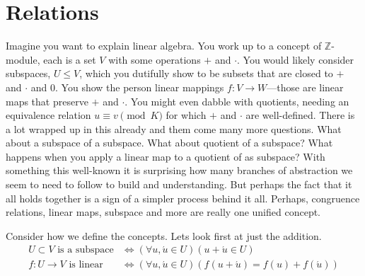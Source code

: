 
\section{Relations}
Imagine you want to explain linear algebra.  You work up to a concept of 
$\mathbb{Z}$-module, each is a set $V$ with some operations $+$ and $\cdot$. You would likely
consider subspaces, $U\leq V$, which you dutifully show to be subsets that are
closed to $+$ and $\cdot$ and $0$. You show the person linear mappings $f:V\to
W$---those are linear maps that preserve $+$ and $\cdot$.  You might even dabble
with quotients, needing an equivalence relation $u\equiv v\pmod{K}$ for which
$+$ and $\cdot$ are well-defined.  There is a lot wrapped up in this already and
them come many more questions.  What about a subspace of a subspace.  What about
quotient of a subspace? What happens when you apply a linear map to a quotient
of as subspace? With something this well-known it is surprising how many
branches of abstraction we seem to need to follow to build and understanding.
But perhaps the fact that it all holds together is a sign of a simpler process
behind it all. Perhaps, congruence relations, linear maps, subspace and more are
really one unified concept.


Consider how we define the concepts.  Lets look first at just the addition.
\begin{align*}
    U\subset V\text{ is a subspace} & \Leftrightarrow (\forall u,\acute{u}\in U)(u+\acute{u}\in U)\\
    f:U\to V\text{ is linear} & \Leftrightarrow (\forall u,\acute{u}\in U)(f(u+\acute{u})=f(u)+f(\acute{u}))\\
\end{align*}


